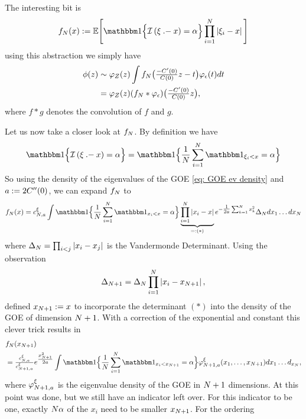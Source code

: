 The interesting bit is
\[
	f_\dimension(x):=\E\Bigg[
		\ind\Bigl\{
			\negEV\left(\xi \dotMinus x\right) = \alpha
		\Bigr\}
		\prod_{i=1}^\dimension \left|
			\xi_i - x
		\right|
	\Bigg]
\]
using this abstraction we simply have
\[\begin{aligned}
	\phi(z)
	&\sim \varphi_Z(z)
	\int f_N\bigl(\tfrac{-C'(0)}{C(0)}z - t\bigr)
	\varphi_\epsilon(t)dt\\
	&= \varphi_Z(z)
	(f_N * \varphi_\epsilon)\bigl(\tfrac{-C'(0)}{C(0)}z\bigr),
\end{aligned}\]
where \(f*g\) denotes the convolution of \(f\) and \(g\).

Let us now take a closer look at \(f_N\). 
By definition we have
\[
		\ind\Bigl\{
			\negEV\left(\xi \dotMinus x\right) = \alpha
		\Bigr\}
		= \ind\Bigl\{
			\frac1\dimension\sum_{i=1}^\dimension \ind_{\xi_i < x} = \alpha
		\Bigr\}
\]
So using the density of the
eigenvalues of the GOE \eqref{eq: GOE ev density} and \(a:=2C''(0)\),
we can expand \(f_N\) to
\[
	f_\dimension(x)
	= c^\xi_{\dimension,a}\int
	\ind\Bigl\{
			\frac1\dimension\sum_{i=1}^\dimension \ind_{x_i < x} = \alpha
	\Bigr\}
	\underbrace{
	\prod_{i=1}^\dimension \left|
		x_i - x
	\right|
	}_{=:(*)}
	e^{-\tfrac1{2a}\sum_{k=1}^\dimension x_k^2} \Delta_N dx_1\dots dx_\dimension
\]
where \(\Delta_N = \prod_{i<j}|x_i-x_j|\) is the Vandermonde
Determinant. Using the observation
\[
	\Delta_{N+1} = 
	\Delta_N\prod_{i=1}^N \left|
		x_i - x_{N+1}
	\right|,
\]
\textcite{fyodorovComplexityRandomEnergy2004} defined \(x_{N+1}:=x\) to
incorporate the determinant \((*)\) into the density of the GOE of dimension
\(N+1\). With a correction of the exponential and constant this
clever trick results in
\[\begin{aligned}
	&f_\dimension(x_{\dimension+1})\\
	&= \tfrac{c^\xi_{\dimension, a}}{c^\xi_{\dimension+1,a}}
	e^{\tfrac{x_{\dimension+1}^2}{2a}}
	\int \ind\Bigl\{
			\frac1\dimension\sum_{i=1}^\dimension \ind_{x_i < x_{\dimension+1}} = \alpha
	\Bigr\}
	\varphi^\xi_{\dimension+1,a}(x_1,\dots,x_{\dimension+1})
	dx_1\dots d_{x_\dimension},
\end{aligned}\]
where \(\varphi^\xi_{N+1,a}\) is the eigenvalue density of the GOE
in \(N+1\) dimensions. At this point
\textcite{fyodorovComplexityRandomEnergy2004} was done, but we still have an
indicator left over. For this indicator to be one, exactly \(N\alpha\)
of the \(x_i\) need to be smaller \(x_{N+1}\). For the ordering
